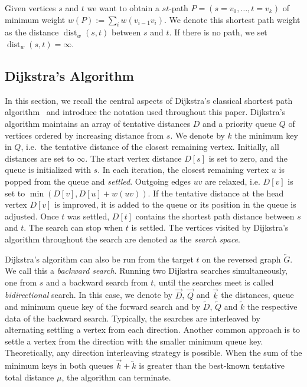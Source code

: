 \documentclass[manuscript]{acmart}
\newcommand*{\dist}{\operatorname{dist}}
\begin{document}
Given vertices $s$ and $t$ we want to obtain a $st$-path $P=(s=v_0,\dots,t=v_k)$ of minimum weight $w(P) := \sum_{i} w(v_{i-1}v_i)$.
We denote this shortest path weight as the distance $\dist_w(s,t)$ between $s$ and $t$.
If there is no path, we set $\dist_w(s,t)=\infty$.

\subsection{Dijkstra's Algorithm}

In this section, we recall the central aspects of Dijkstra's classical shortest path algorithm~\cite{d-ntpcg-59} and introduce the notation used throughout this paper.
Dijkstra's algorithm maintains an array of tentative distances $D$ and a priority queue $Q$ of vertices ordered by increasing distance from $s$.
We denote by $k$ the minimum key in $Q$, i.e.\ the tentative distance of the closest remaining vertex.
Initially, all distances are set to $\infty$.
The start vertex distance $D[s]$ is set to zero, and the queue is initialized with $s$.
In each iteration, the closest remaining vertex $u$ is popped from the queue and \emph{settled}.
Outgoing edges $uv$ are relaxed, i.e. $D[v]$ is set to $\min(D[v], D[u] + w(uv))$.
If the tentative distance at the head vertex $D[v]$ is improved, it is added to the queue or its position in the queue is adjusted.
Once $t$ was settled, $D[t]$ contains the shortest path distance between $s$ and $t$.
The search can stop when $t$ is settled.
The vertices visited by Dijkstra's algorithm throughout the search are denoted as the \emph{search space}.

Dijkstra's algorithm can also be run from the target $t$ on the reversed graph $\overleftarrow{G}$.
We call this a \emph{backward search}.
Running two Dijkstra searches simultaneously, one from $s$ and a backward search from $t$, until the searches meet is called \emph{bidirectional} search.
In this case, we denote by $\overrightarrow{D}$, $\overrightarrow{Q}$ and $\overrightarrow{k}$ the distances, queue and minimum queue key of the forward search and by $\overleftarrow{D}$, $\overleftarrow{Q}$ and $\overleftarrow{k}$ the respective data of the backward search.
Typically, the searches are interleaved by alternating settling a vertex from each direction.
Another common approach is to settle a vertex from the direction with the smaller minimum queue key.
Theoretically, any direction interleaving strategy is possible.
When the sum of the minimum keys in both queues $\overrightarrow{k} + \overleftarrow{k}$ is greater than the best-known tentative total distance $\mu$, the algorithm can terminate.
\end{document}
